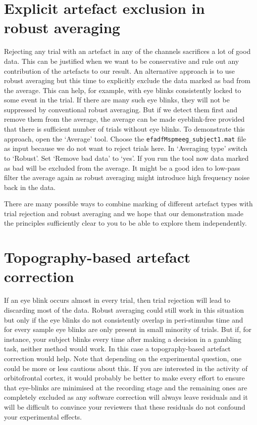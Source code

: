 \section{Explicit artefact exclusion in robust averaging}

Rejecting any trial with an artefact in any of the channels sacrifices a lot of good data.  This can be justified when we want to be conservative and rule out any contribution of the artefacts to our result. An alternative approach is to use robust averaging but this time to explicitly exclude the data marked as bad from the average. This can help, for example, with eye blinks consistently locked to some event in the trial. If there are many such eye blinks, they will not be suppressed by conventional robust averaging. But if we detect them first and remove them from the average, the average can be made eyeblink-free provided that there is sufficient number of trials without eye blinks. To demonstrate this approach, open the `Average' tool. Choose the \texttt{efadfMspmeeg\_subject1.mat} file as input because we do not want to reject trials here. In `Averaging type' switch to `Robust'.  Set `Remove bad data' to `yes'. If you run the tool now data marked as bad will be excluded from the average. It might be a good idea to low-pass filter the average again as robust averaging might introduce high frequency noise back in the data. 

There are many possible ways to combine marking of different artefact types with trial rejection and robust averaging and we hope that our demonstration made the principles sufficiently clear to you to be able to explore them independently. 



\section{Topography-based artefact correction}

If an eye blink occurs almost in every trial, then trial rejection will lead to discarding most of the data. Robust averaging could still work in this situation but only if the eye blinks do not consistently overlap in peri-stimulus time and for every sample eye blinks are only present in small minority of trials. But if, for instance, your subject blinks every time after making a decision in a gambling task, neither method would work. In this case a topography-based artefact correction would help. Note that depending on the experimental question, one could be more or less cautious about this. If you are interested in the activity of orbitofrontal cortex, it would probably be better to make every effort to ensure that eye-blinks are minimised at the recording stage and the remaining ones are completely excluded as any software correction will always leave residuals and it will be difficult to convince your reviewers that these residuals do not confound your experimental effects.


